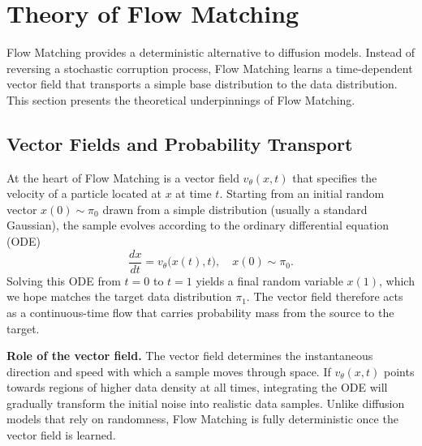 

\section{Theory of Flow Matching}

Flow Matching provides a deterministic alternative to diffusion
models.  Instead of reversing a stochastic corruption process, Flow
Matching learns a time-dependent vector field that transports a
simple base distribution to the data distribution.  This section
presents the theoretical underpinnings of Flow Matching.

\subsection{Vector Fields and Probability Transport}

At the heart of Flow Matching is a vector field $v_\theta(x,t)$ that
specifies the velocity of a particle located at $x$ at time $t$.
Starting from an initial random vector $x(0)\sim\pi_0$ drawn from a
simple distribution (usually a standard Gaussian), the sample evolves
according to the ordinary differential equation (ODE)
\begin{equation}
  \frac{dx}{dt} = v_\theta\bigl(x(t), t\bigr),
  \quad x(0) \sim \pi_0.
\end{equation}
Solving this ODE from $t=0$ to $t=1$ yields a final random variable
$x(1)$, which we hope matches the target data distribution \(\pi_1\).
The vector field therefore acts as a continuous-time flow that carries
probability mass from the source to the target.

\begin{solutionbox}
  \textbf{Role of the vector field.}  The vector field determines the
  instantaneous direction and speed with which a sample moves through
  space.  If $v_\theta(x,t)$ points towards regions of higher data
  density at all times, integrating the ODE will gradually transform
  the initial noise into realistic data samples.  Unlike diffusion
  models that rely on randomness, Flow Matching is fully
  deterministic once the vector field is learned.
\end{solutionbox}

